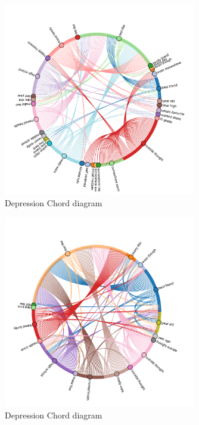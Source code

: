 \documentclass[sn-mathphys,Numbered]{sn-jnl}%
\theoremstyle{thmstyleone}%
\theoremstyle{thmstyletwo}%
\theoremstyle{thmstylethree}%
\begin{document}
\begin{figure}[H]
\centering
    \includegraphics[width=0.75\textwidth]{dep_chord.png}
    \caption{Depression Chord diagram}
    \label{dep_chord}
\end{figure}

\begin{figure}[H]
\centering
    \includegraphics[width=0.75\textwidth]{suicide_chord.png}
    \caption{Depression Chord diagram}
    \label{suicide_chord}
\end{figure}        
\end{document}
